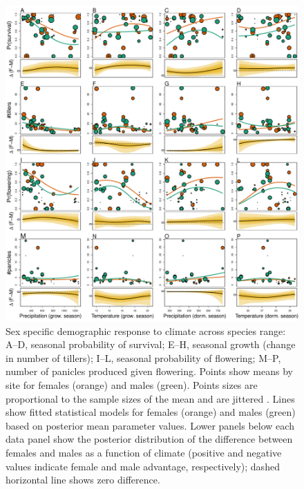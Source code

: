 \documentclass[12pt]{article}
\begin{document}
\begin{figure}[H]
  \begin{center}
    \includegraphics[width=0.95\linewidth]{Figures/vital_rates.pdf}
  \caption{Sex specific demographic response to climate across species range: A--D, seasonal probability of survival; E--H, seasonal growth (change in number of tillers); I--L, seasonal probability of flowering; M--P, number of panicles produced given flowering. 
  Points show means by site for females (orange) and males (green). 
  Points sizes are proportional to the sample sizes of the mean and are jittered .
  Lines show fitted statistical models for females (orange) and males (green) based on posterior mean parameter values.
  Lower panels below each data panel show the posterior distribution of the difference between females and males as a function of climate (positive and negative values indicate female and male advantage, respectively); dashed horizontal line shows zero difference.}
  \label{Sup:vital_rates}
  \end{center}
\end{figure}
\end{document}
